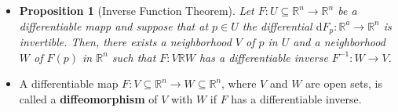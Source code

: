 \documentclass[10pt]{article}
\newtheorem{proposition}[lemma]{Proposition}
\newcommand{\dee}{\mathrm{d}}
\newcommand{\ra}{\rightarrow}
\newcommand{\Real}{\mathbb{R}}
\newcommand{\sseq}{\subseteq}
\begin{document}
\begin{itemize}
    \item \begin{proposition}[Inverse Function Theorem]
      Let $F : U \sseq \Real^n \ra \Real^n$ be a differentiable mapp and suppose that at $p \in U$ the differential $\dee F_p: \Real^a \ra \Real^n$ is invertible. Then, there exists a neighborhood $V$ of $p$ in $U$ and a neighborhood $W$ of $F(p)$ in $\Real^n$ such that $F: V \Real W$ has a differentiable inverse $F^{-1} : W \ra V$.
    \end{proposition}

    \item A differentiable map $F: V \sseq \Real^n \ra W \sseq \Real^n$, where $V$ and $W$ are open sets, is called a {\bf diffeomorphism} of $V$ with $W$ if $F$ has a differentiable inverse.
  \end{itemize}
 
  
\end{document}

